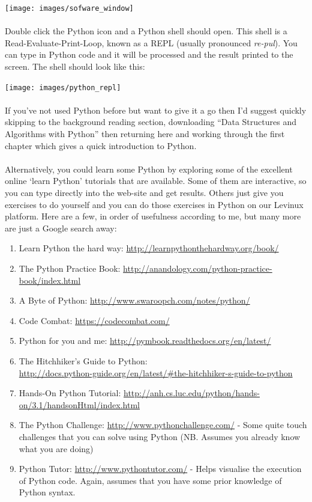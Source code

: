 \documentclass[10pt, a4paper, twosize]{article}
\begin{document}
\texttt{[image: images/sofware\_window]}

\paragraph{} Double click the Python icon and a Python shell should open. This shell is a Read-Evaluate-Print-Loop, known as a REPL (usually pronounced \emph{re-pul}). You can type in Python code and it will be processed and the result printed to the screen. The shell should look like this:

\texttt{[image: images/python\_repl]}

\paragraph{} If you've not used Python before but want to give it a go then I'd suggest quickly skipping to the background reading section, downloading ``Data Structures and Algorithms with Python'' then returning here and working through the first chapter which gives a quick introduction to Python. 

\paragraph{} Alternatively, you could learn some Python by exploring some of the excellent online `learn Python' tutorials that are available. Some of them are interactive, so you can type directly into the web-site and get results. Others just give you exercises to do yourself and you can do those exercises in Python on our Levinux platform. Here are a few, in order of usefulness according to me, but many more are just a Google search away:

\begin{enumerate}
\item Learn Python the hard way: \url{http://learnpythonthehardway.org/book/}
\item The Python Practice Book: \url{http://anandology.com/python-practice-book/index.html}
\item A Byte of Python: \url{http://www.swaroopch.com/notes/python/}
\item Code Combat: \url{https://codecombat.com/}
\item Python for you and me: \url{http://pymbook.readthedocs.org/en/latest/}
\item The Hitchhiker's Guide to Python:\\ \url{http://docs.python-guide.org/en/latest/#the-hitchhiker-s-guide-to-python}
\item Hands-On Python Tutorial: \url{http://anh.cs.luc.edu/python/hands-on/3.1/handsonHtml/index.html}
\item The Python Challenge: \url{http://www.pythonchallenge.com/} - Some quite touch challenges that you can solve using Python (NB. Assumes you already know what you are doing)
\item Python Tutor: \url{http://www.pythontutor.com/} - Helps visualise the execution of Python code. Again, assumes that you have some prior knowledge of Python syntax.
\end{enumerate}
\end{document}
